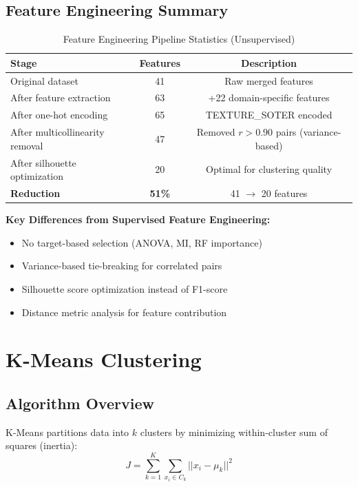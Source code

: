 \subsection{Feature Engineering Summary}

\begin{table}[H]
\centering
\caption{Feature Engineering Pipeline Statistics (Unsupervised)}
\label{tab:fe_summary_unsupervised}
\begin{tabular}{|l|c|c|}
\hline
\textbf{Stage} & \textbf{Features} & \textbf{Description} \\
\hline
Original dataset & 41 & Raw merged features \\
After feature extraction & 63 & +22 domain-specific features \\
After one-hot encoding & 65 & TEXTURE\_SOTER encoded \\
After multicollinearity removal & 47 & Removed $r > 0.90$ pairs (variance-based) \\
After silhouette optimization & 20 & Optimal for clustering quality \\
\hline
\textbf{Reduction} & \textbf{51\%} & 41 $\rightarrow$ 20 features \\
\hline
\end{tabular}
\end{table}

\textbf{Key Differences from Supervised Feature Engineering:}
\begin{itemize}
    \item No target-based selection (ANOVA, MI, RF importance)
    \item Variance-based tie-breaking for correlated pairs
    \item Silhouette score optimization instead of F1-score
    \item Distance metric analysis for feature contribution
\end{itemize}

\section{K-Means Clustering}

\subsection{Algorithm Overview}
K-Means partitions data into $k$ clusters by minimizing within-cluster sum of squares (inertia):
\begin{equation}
    J = \sum_{k=1}^{K} \sum_{x_i \in C_k} ||x_i - \mu_k||^2
\end{equation}

